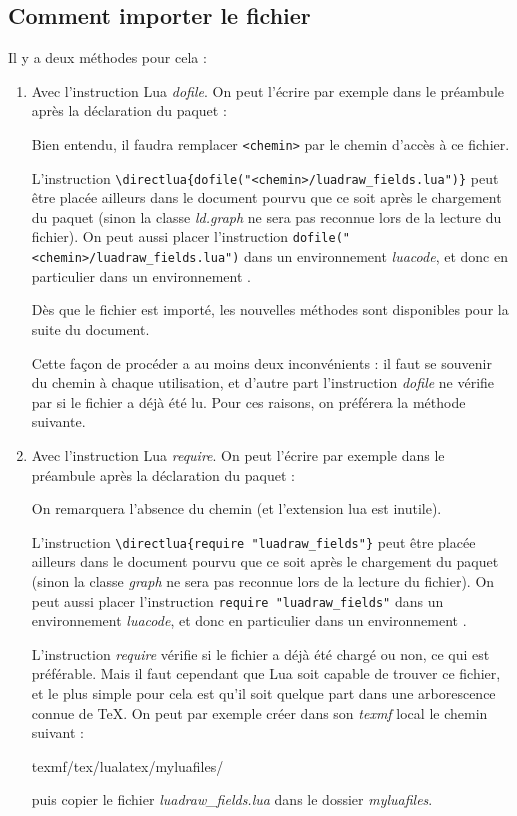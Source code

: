 \subsection{Comment importer le fichier}

Il y a deux méthodes pour cela :

\begin{enumerate}
    \item Avec l'instruction Lua \emph{dofile}. On peut l'écrire par exemple dans le préambule après la déclaration du paquet :
    \begin{TeXcode}
    \usepackage[]{luadraw}
    \end{TeXcode}
    Bien entendu, il faudra remplacer \verb|<chemin>| par le chemin d'accès à ce fichier. 
    
    L'instruction \verb|\directlua{dofile("<chemin>/luadraw_fields.lua")}| peut être placée ailleurs dans le document pourvu que ce soit après le chargement du paquet (sinon la classe \emph{ld.graph} ne sera pas reconnue lors de la lecture du fichier). On peut aussi placer l'instruction \verb|dofile("<chemin>/luadraw_fields.lua")| dans un environnement \emph{luacode}, et donc en particulier dans un environnement \luadrawenv.
    
    Dès que le fichier est importé, les nouvelles méthodes sont disponibles pour la suite du document.
    
    Cette façon de procéder a au moins deux inconvénients : il faut se souvenir du chemin à chaque utilisation, et d'autre part l'instruction \emph{dofile} ne vérifie par si le fichier a déjà été lu. Pour ces raisons, on préférera la méthode suivante.
    
    \item Avec l'instruction Lua \emph{require}. On peut l'écrire par exemple dans le préambule après la déclaration du paquet :
    \begin{TeXcode}
    \usepackage[]{luadraw}
    \end{TeXcode}
    On remarquera l'absence du chemin (et l'extension lua est inutile).
    
    L'instruction \verb|\directlua{require "luadraw_fields"}| peut être placée ailleurs dans le document pourvu que ce soit après le chargement du paquet (sinon la classe \emph{graph} ne sera pas reconnue lors de la lecture du fichier). On peut aussi placer l'instruction \verb|require "luadraw_fields"| dans un environnement \emph{luacode}, et donc en particulier dans un environnement \luadrawenv.
    
    L'instruction \emph{require} vérifie si le fichier a déjà été chargé ou non, ce qui est préférable. Mais il faut cependant que Lua soit capable de trouver ce fichier, et le plus simple pour cela est qu'il soit quelque part dans une arborescence connue de TeX. On peut par exemple créer dans son \emph{texmf} local le chemin suivant :
    \begin{TeXcode}
    texmf/tex/lualatex/myluafiles/
    \end{TeXcode}
    puis copier le fichier \emph{luadraw\_fields.lua} dans le dossier \emph{myluafiles}.
\end{enumerate}


